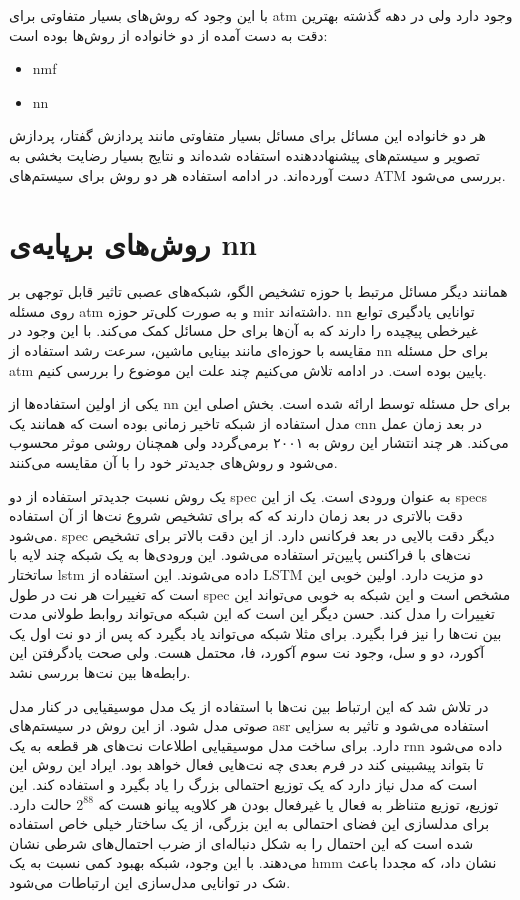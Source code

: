 با این وجود که روش‌های بسیار متفاوتی برای \gls{atm} وجود دارد ولی در دهه گذشته
بهترین دقت به دست آمده از دو خانواده از روش‌ها بوده است:
\begin{itemize}
    \item \gls{nmf}
    \item \gls{nn}
\end{itemize}
هر دو خانواده این مسائل برای مسائل بسیار متفاوتی مانند پردازش گفتار، پردازش
تصویر و سیستم‌های پیشنهاددهنده استفاده شده‌اند و نتایج بسیار رضایت بخشی به دست
آورده‌اند. در ادامه استفاده هر دو روش برای سیستم‌های \gls{ATM} بررسی می‌شود.

\section{روش‌های برپایه‌ی \gls{nn}}
همانند دیگر مسائل مرتبط با حوزه تشخیص الگو، شبکه‌های عصبی تاثیر قابل توجهی بر
روی مسئله \gls{atm} و به صورت کلی‌تر حوزه \gls{mir} داشته‌اند. \gls{nn} توانایی
یادگیری توابع غیرخطی پیچیده‌ را دارند که به آن‌ها برای حل مسائل کمک می‌کند. با
این وجود در مقایسه با حوزه‌ای مانند بینایی ماشین، سرعت رشد استفاده از \gls{nn}
برای حل مسئله \gls{atm} پایین بوده است. در ادامه تلاش می‌کنیم چند علت این موضوع
را بررسی کنیم.

یکی از اولین استفاده‌ها از \gls{nn} برای حل مسئله توسط
\cite{marolt2004connectionist} ارائه شده است. بخش اصلی این مدل استفاده از شبکه
تاخیر زمانی بوده است که همانند یک \gls{cnn} در بعد زمان عمل می‌کند. هر چند
انتشار این روش به ۲۰۰۱ برمی‌گردد ولی همچنان روشی موثر محسوب می‌شود و روش‌های
جدیدتر خود را با آن مقایسه می‌کنند.

یک روش نسبت جدیدتر \cite{bock2012polyphonic} استفاده از دو \gls{spec} به عنوان
ورودی است. یک از این \glspl{spec} دقت بالاتری در بعد زمان دارند که که برای تشخیص
شروع نت‌ها از آن استفاده می‌شود. \gls{spec} دیگر دقت بالایی در بعد فرکانس دارد.
از این دقت بالاتر برای تشخیص نت‌های با فراکنس پایین‌تر استفاده می‌شود. این
ورودی‌ها به یک شبکه چند لایه با ساتختار \gls{lstm} داده می‌شوند. این استفاده از
\gls{LSTM} دو مزیت دارد. اولین خوبی این است که تغییرات هر نت در طول \gls{spec}
مشخص است و این شبکه به خوبی می‌تواند این تغییرات را مدل کند. حسن دیگر این است که
این شبکه می‌تواند روابط طولانی مدت بین نت‌ها را نیز فرا بگیرد. برای مثلا شبکه
می‌تواند یاد بگیرد که پس از دو نت اول یک آکورد، دو و سل، وجود نت سوم آکورد، فا،
محتمل هست. ولی صحت یادگرفتن این رابطه‌ها بین نت‌ها بررسی نشد.

در \cite{sigtia2016end} تلاش شد که این ارتباط بین نت‌ها با استفاده از یک مدل
موسیقیایی در کنار مدل صوتی مدل شود. از این روش در سیستم‌های \gls{asr} استفاده
می‌شود و تاثیر به سزایی دارد. برای ساخت مدل موسیقیایی اطلاعات نت‌های هر قطعه به
یک \gls{rnn} داده می‌شود تا بتواند پیشبینی کند در فرم بعدی چه نت‌هایی فعال خواهد
بود. ایراد این روش این است که مدل نیاز دارد که یک توزیع احتمالی بزرگ را یاد
بگیرد و استفاده کند. این توزیع، توزیع متناظر به فعال یا غیرفعال بودن هر کلاویه
پیانو هست که $2^{88}$ حالت دارد. برای مدلسازی این فضای احتمالی به این بزرگی، از
یک ساختار خیلی خاص استفاده شده است که این احتمال را به شکل دنباله‌ای از ضرب
احتمال‌های شرطی نشان می‌دهند. با این وجود، شبکه بهبود کمی نسبت به یک \gls{hmm}
نشان داد، که مجددا باعث شک در توانایی مدل‌سازی این ارتباطات می‌شود.

